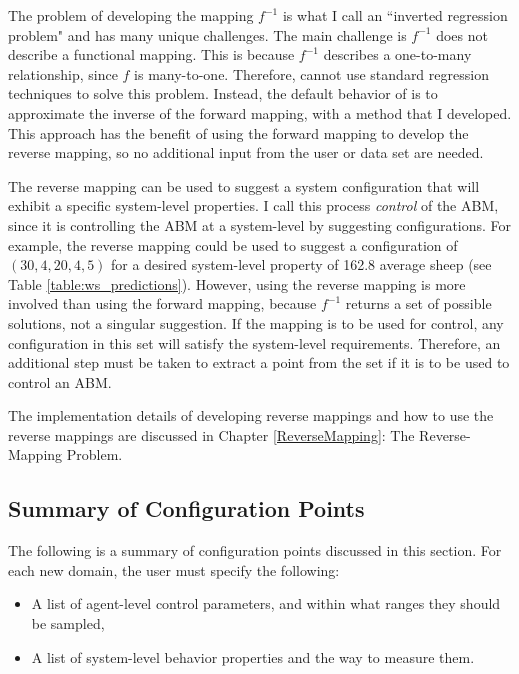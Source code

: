 The problem of developing the mapping $f^{-1}$ is what I call an ``inverted regression problem" and has many unique challenges.
The main challenge is $f^{-1}$ does not describe a functional mapping.
This is because $f^{-1}$ describes a one-to-many relationship, since $f$ is many-to-one.
Therefore, \fw cannot use standard regression techniques to solve this problem.
Instead, the default behavior of \fw is to approximate the inverse of the forward mapping, with a method that I developed.
This approach has the benefit of using the forward mapping to develop the reverse mapping, so no additional input from the user or data set are needed.

The reverse mapping can be used to suggest a system configuration that will exhibit a specific system-level properties.
I call this process \textit{control} of the ABM, since it is controlling the ABM at a system-level by suggesting configurations.
For example, the reverse mapping could be used to suggest a configuration of $(30, 4, 20, 4, 5)$  for a desired system-level property of 162.8 average sheep (see Table \ref{table:ws_predictions}).
However, using the reverse mapping is more involved than using the forward mapping, because $f^{-1}$ returns a set of possible solutions, not a singular suggestion.
If the mapping is to be used for control, any configuration in this set will satisfy the system-level requirements.
Therefore, an additional step must be taken to extract a point from the set if it is to be used to control an ABM.

The implementation details of developing reverse mappings and how to use the reverse mappings are discussed in Chapter \ref{ReverseMapping}: The Reverse-Mapping Problem.





\subsection{Summary of Configuration Points}

The following is a summary of configuration points discussed in this section.
For each new domain, the user must specify the following:
\begin{itemize}
   \item A list of agent-level control parameters, and within what ranges they should be sampled,
   \item A list of system-level behavior properties and the way to measure them.
\end{itemize}

